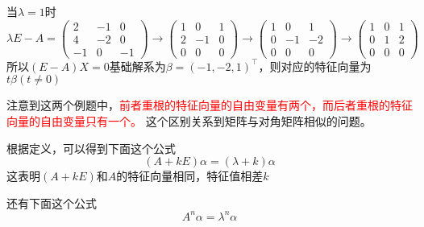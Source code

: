 \begin{solution}
    当$\lambda = 1$时
    \[
        \lambda E - A =
        \begin{pmatrix}
            2  & -1 & 0  \\
            4  & -2 & 0  \\
            -1 & 0  & -1
        \end{pmatrix}
        \longrightarrow
        \begin{pmatrix}
            1 & 0  & 1 \\
            2 & -1 & 0 \\
            0 & 0  & 0
        \end{pmatrix}
        \longrightarrow
        \begin{pmatrix}
            1 & 0  & 1  \\
            0 & -1 & -2 \\
            0 & 0  & 0
        \end{pmatrix}
        \longrightarrow
        \begin{pmatrix}
            1 & 0 & 1 \\
            0 & 1 & 2 \\
            0 & 0 & 0
        \end{pmatrix}
    \]
    所以$(E-A)X=0$基础解系为$\beta=(-1,-2,1)^\intercal$，则对应的特征向量为$t\beta (t\neq 0)$
\end{solution}

注意到这两个例题中，\textcolor{red}{前者重根的特征向量的自由变量有两个，而后者重根的特征向量的自由变量只有一个。}
这个区别关系到矩阵与对角矩阵相似的问题。

根据定义，可以得到下面这个公式
\begin{equation}
    (A+kE)\alpha = (\lambda + k)\alpha
\end{equation}
这表明$(A+kE)$和$A$的特征向量相同，特征值相差$k$

还有下面这个公式
\begin{equation}
    A^n\alpha = \lambda^n\alpha
\end{equation}

